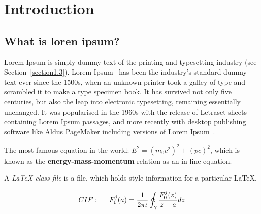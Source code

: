 
\ifpdf
\graphicspath{{Chapter1/figs/Raster/}{Chapter1/figs/PDF/}{Chapter1/figs/}}
\else
\graphicspath{{Chapter1/figs/Vector/}{Chapter1/figs/}}
\fi


\chapter{Introduction}\label{intro}

\section{What is loren ipsum?}\label{intro:what}
  
  Lorem Ipsum is simply dummy text of the printing and typesetting industry (see 
  Section~\ref{section1.3}). Lorem Ipsum~\citep{Aup91} has been the industry's 
  standard dummy text ever since the 1500s, when an unknown printer took a galley 
  of type and scrambled it to make a type specimen book. It has survived not only 
  five centuries, but also the leap into electronic typesetting, remaining 
  essentially unchanged. It was popularised in the 1960s with the release of 
  Letraset sheets containing Lorem Ipsum passages, and more recently with desktop 
  publishing software like Aldus PageMaker including versions of Lorem 
  Ipsum~\citep{AAB95,Con90,LM65}.

  The most famous equation in the world: $E^2 = (m_0c^2)^2 + (pc)^2$, which is 
  known as the \textbf{energy-mass-momentum} relation as an in-line equation.

  A {\em \LaTeX{} class file} is a file, which holds style information for a particular \LaTeX{}.


  \begin{align}
  CIF: \hspace*{5mm}F_0^j(a) = \frac{1}{2\pi \iota} \oint_{\gamma} \frac{F_0^j(z)}{z - a} dz
  \end{align}
  
